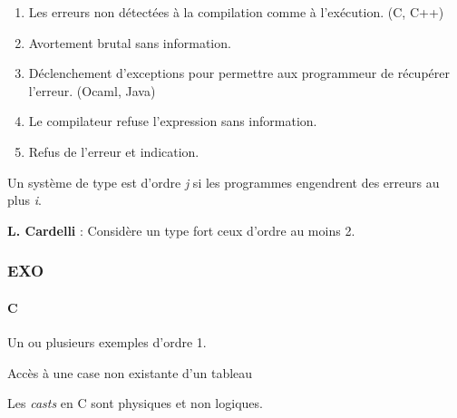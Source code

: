 \documentclass[]{article}
\newenvironment{Shaded}{}{}
\newcommand{\DataTypeTok}[1]{\textcolor[rgb]{0.56,0.13,0.00}{#1}}
\newcommand{\DecValTok}[1]{\textcolor[rgb]{0.25,0.63,0.44}{#1}}
\newcommand{\SpecialCharTok}[1]{\textcolor[rgb]{0.25,0.44,0.63}{#1}}
\newcommand{\StringTok}[1]{\textcolor[rgb]{0.25,0.44,0.63}{#1}}
\newcommand{\ImportTok}[1]{#1}
\newcommand{\ControlFlowTok}[1]{\textcolor[rgb]{0.00,0.44,0.13}{\textbf{#1}}}
\newcommand{\PreprocessorTok}[1]{\textcolor[rgb]{0.74,0.48,0.00}{#1}}
\newcommand{\NormalTok}[1]{#1}
\providecommand{\tightlist}{%
  \setlength{\itemsep}{0pt}\setlength{\parskip}{0pt}}
\let\oldparagraph\paragraph
\renewcommand{\paragraph}[1]{\oldparagraph{#1}\mbox{}}
\begin{document}
\begin{enumerate}
\def\labelenumi{\arabic{enumi}.}
\tightlist
\item
  Les erreurs non détectées à la compilation comme à l'exécution. (C,
  C++)
\item
  Avortement brutal sans information.
\item
  Déclenchement d'exceptions pour permettre aux programmeur de récupérer
  l'erreur. (Ocaml, Java)
\item
  Le compilateur refuse l'expression sans information.
\item
  Refus de l'erreur et indication.
\end{enumerate}

Un système de type est d'ordre \emph{j} si les programmes engendrent des
erreurs au plus \emph{i}.

\textbf{L. Cardelli} : Considère un type fort ceux d'ordre au moins 2.

\subsubsection{EXO}\label{exo}

\paragraph{C}\label{c}

Un ou plusieurs exemples d'ordre 1.

Accès à une case non existante d'un tableau

\begin{Shaded}
\end{Shaded}

Les \emph{casts} en C sont physiques et non logiques.
\end{document}
